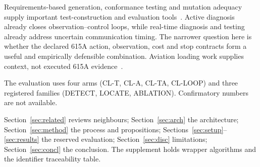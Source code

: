 Requirements-based generation, conformance testing and mutation adequacy supply
important test-construction and evaluation
tools~\cite{tretmans1996,petrenko2016,jia2011,yang2025}. Active diagnosis already
closes observation--control loops, while real-time diagnosis and testing already
address uncertain communication timing. The narrower question here is whether
the declared 615A action, observation, cost and stop contracts form a useful and
empirically defensible combination. Aviation loading work supplies context, not
executed 615A evidence~\cite{chanthery2019,efkemann2011,sartaj2021}.

The evaluation uses four arms (CL-T, CL-A, CL-TA, CL-LOOP) and three registered
families (DETECT, LOCATE, ABLATION). Confirmatory numbers are not available.

Section~\ref{sec:related} reviews neighbours; Section~\ref{sec:arch} the
architecture; Section~\ref{sec:method} the process and propositions;
Sections~\ref{sec:setup}--\ref{sec:results} the reserved evaluation;
Section~\ref{sec:disc} limitations; Section~\ref{sec:concl} the conclusion.
The supplement holds wrapper algorithms and the identifier traceability table.
